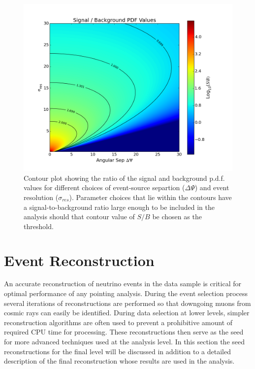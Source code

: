 \documentclass{gatech-thesis}
\begin{document}
\begin{figure}[ht]
  \begin{center}
    \includegraphics[width=.65\textwidth,keepaspectratio]{SignalOverBackground_ContourMap.png}
  \end{center}
  \caption[Signal over Background PDF ratio by Event Resolution and Angular Error]{Contour plot showing the ratio of the signal and background p.d.f. values for different choices of event-source separtion ($\Delta \Psi$) and event resolution ($\sigma_{res}$). Parameter choices that lie within the contours have a signal-to-background ratio large enough to be included in the analysis should that contour value of $S/B$ be chosen as the threshold.}
  \label{fig:QualityCutParameterSpace}
\end{figure}

\section{Event Reconstruction}
An accurate reconstruction of neutrino events in the data sample is critical for optimal performance of any pointing analysis. During the event selection process several iterations of reconstructions are performed so that downgoing muons from cosmic rays can easily be identified. During data selection at lower levels, simpler reconstruction algorithms are often used to prevent a prohibitive amount of required CPU time for processing. These reconstructions then serve as the seed for more advanced techniques used at the analysis level. In this section the seed reconstructions for the final level will be discussed in addition to a detailed description of the final reconstruction whose results are used in the analysis.
\end{document}

